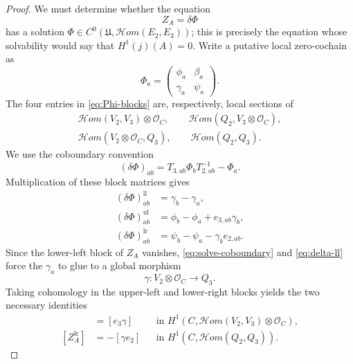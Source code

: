 \documentclass[10pt,a4paper]{amsart}
\newcommand{\cHom}{\mathcal{H}om}
\newcommand{\cO}{\mathcal O}
\begin{document}
\begin{proof}
We must determine whether the equation
\begin{equation}\label{eq:solve-coboundary}
 Z_A=\delta\Phi
\end{equation}
has a solution
$\Phi\in C^0(\mathfrak U,\cHom(E_2,E_3))$; this is precisely the equation
whose solvability would say that $H^1(j)(A)=0$.  Write a putative local
zero-cochain as
\begin{equation}\label{eq:Phi-blocks}
 \Phi_a=
 \begin{pmatrix}
  \phi_a&\beta_a\\
  \gamma_a&\psi_a
 \end{pmatrix}.
\end{equation}
The four entries in \eqref{eq:Phi-blocks} are, respectively, local sections
of
$$
\begin{gathered}
 \cHom(V_2,V_3)\otimes\cO_C,\qquad
 \cHom(Q_2,V_3\otimes\cO_C),\\
 \cHom(V_2\otimes\cO_C,Q_3),\qquad
 \cHom(Q_2,Q_3).
\end{gathered}
$$
We use the coboundary convention
$$
 (\delta\Phi)_{ab}
 =T_{3,ab}\Phi_bT_{2,ab}^{-1}-\Phi_a.
$$
Multiplication of these block matrices gives
\begin{align}
 (\delta\Phi)_{ab}^{\mathrm{ll}}
 &=\gamma_b-\gamma_a,\label{eq:delta-ll}\\
 (\delta\Phi)_{ab}^{\mathrm{ul}}
 &=\phi_b-\phi_a+e_{3,ab}\gamma_b,\label{eq:delta-ul}\\
 (\delta\Phi)_{ab}^{\mathrm{lr}}
 &=\psi_b-\psi_a-\gamma_be_{2,ab}.\label{eq:delta-lr}
\end{align}
Since the lower-left block of $Z_A$ vanishes,
\eqref{eq:solve-coboundary} and \eqref{eq:delta-ll} force the
$\gamma_a$ to glue to a global morphism
$$
 \gamma:V_2\otimes\cO_C\longrightarrow Q_3.
$$
Taking cohomology in the upper-left and lower-right blocks yields the two
necessary identities
\begin{align}
 [Z_A^{\mathrm{ul}}]
 &=[e_3\gamma]
 &&\text{in }H^1\!\left(
 C,\cHom(V_2,V_3)\otimes\cO_C\right),
 \label{eq:block-identity-ul}\\
 [Z_A^{\mathrm{lr}}]
 &=-[\gamma e_2]
 &&\text{in }H^1\!\left(C,\cHom(Q_2,Q_3)\right).
 \label{eq:block-identity-lr}
\end{align}


\end{proof}
\end{document}
